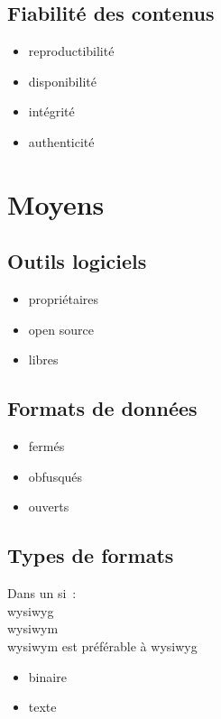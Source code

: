 \documentclass[12pt]{extarticle}
\begin{document}
\subsection{Fiabilité des contenus}
\begin{itemize}
\item{reproductibilité}
\item{disponibilité}
\item{intégrité}
\item{authenticité}
\end{itemize}

\pagebreak
\section{Moyens}

\subsection{Outils logiciels}
\begin{itemize}
\item{propriétaires}
\item{open source}
\item{libres}
\end{itemize}

\subsection{Formats de données}
\begin{itemize}
\item{fermés}
\item{obfusqués}
\item{ouverts}
\end{itemize}

\pagebreak
\subsection{Types de formats}
Dans un \gls{si} :\\
\gls{wysiwyg}\\
\gls{wysiwym}\\
\gls{wysiwym} est préférable à \gls{wysiwyg}

\begin{itemize}
\item{binaire}
\item{texte}
\end{itemize}
\end{document}

